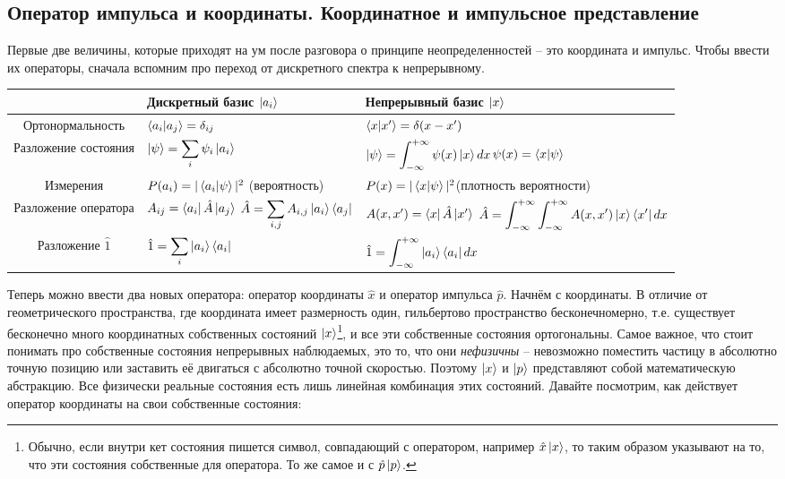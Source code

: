 \subsection{Оператор импульса и координаты. Координатное и импульсное представление}
\hspace{1em} Первые две величины, которые приходят на ум после разговора о принципе неопределенностей -- это координата и импульс. Чтобы ввести их операторы, сначала вспомним про переход от дискретного спектра к непрерывному. 
\begin{center}
\begin{tabular}{ |c|m{12em}|m{15em}| } 
 \hline
 & \textbf{Дискретный базис {$\ket{a_i}$}} & \textbf{Непрерывный базис {$\ket{x}$}} \\ 
 \hline
 Ортонормальность & $\bra{a_i}\ket{a_j} = \delta_{ij}$ & $\bra{x}\ket{x'} = \delta(x-x')$ \\ 
 \hline
 Разложение состояния & \(\displaystyle \ket{\psi} = \sum_i\psi_i\ket{a_i}\) &  \(\displaystyle \ket{\psi} = \int_{-\infty}^{+\infty} \psi(x)\ket{x}dx\)\newline \( \displaystyle \psi(x) = \bra{x}\ket{\psi}\) \\ 
 \hline
 Измерения & $P(a_i) = |\bra{a_i}\ket{\psi}|^2$ \newline (вероятность) & $P(x) = | \bra{x}\ket{\psi}|^2$\newline (плотность вероятности) \\ 
 \hline
 Разложение оператора & $A_{ij} = \bra{a_i}\hat{A}\ket{a_j}$ \newline \(\displaystyle \hat{A} = \sum_{i,j} A_{i,j} \ket{a_i}\bra{a_j}\) & $A(x, x') = \bra{x}\hat{A}\ket{x'}$ \newline \(\displaystyle \hat{A} = \int_{-\infty}^{+\infty}\int_{-\infty}^{+\infty} A(x, x')\ket{x}\bra{x'}dx\) \\ 
 \hline
 Разложение $\hat{1}$ & \(\displaystyle \hat{1} = \sum_{i}\ket{a_i}\bra{a_i} \) & \(\displaystyle \hat{1} = \int_{-\infty}^{+\infty}\ket{a_i}\bra{a_i} dx\) \\ 
 \hline
\end{tabular}
\end{center}
Теперь можно ввести два новых оператора: оператор координаты $\hat{x}$ и оператор импульса $\hat{p}$. Начнём с координаты. В отличие от геометрического пространства, где координата имеет размерность один, гильбертово пространство бесконечномерно, т.е. существует бесконечно много координатных собственных состояний $\ket{x}$\footnote[1]{Обычно, если внутри кет состояния пишется символ, совпадающий с оператором, например $\hat{x}\ket{x}$, то таким образом указывают на то, что эти состояния собственные для оператора. То же самое и с $\hat{p}\ket{p}$.}, и все эти собственные состояния ортогональны. Самое важное, что стоит понимать про собственные состояния непрерывных наблюдаемых, это то, что они \textit{нефизичны} -- невозможно поместить частицу в абсолютно точную позицию или заставить её двигаться с абсолютно точной скоростью. Поэтому $\ket{x}$ и $\ket{p}$ представляют собой математическую абстракцию. Все физически реальные состояния есть лишь линейная комбинация этих состояний. Давайте посмотрим, как действует оператор координаты на свои собственные состояния:
